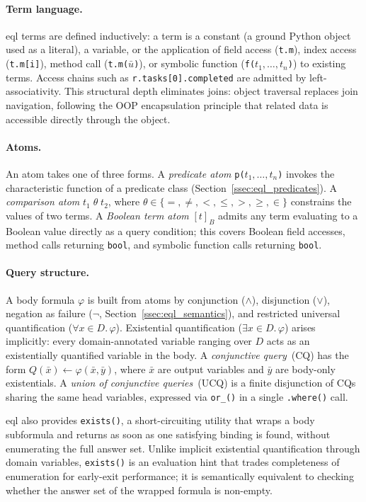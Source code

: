 \documentclass[a4paper,fleqn]{cas-sc}
\begin{document}
\paragraph{Term language.}
\ac{eql} terms are defined inductively: a term is a constant (a ground Python
object used as a literal), a variable, or the application of field access
(\texttt{t.m}), index access (\texttt{t.m[i]}), method call
(\texttt{t.m($\bar{u}$)}), or symbolic function (\texttt{f($t_1,\ldots,t_n$)})
to existing terms. Access chains such as \texttt{r.tasks[0].completed} are
admitted by left-associativity. This structural depth eliminates joins: object traversal replaces join
navigation, following the OOP encapsulation principle that related data is
accessible directly through the object.

\paragraph{Atoms.}
An atom takes one of three forms. A \emph{predicate atom}
\texttt{p($t_1,\ldots,t_n$)} invokes the characteristic function of a
predicate class (Section~\ref{ssec:eql_predicates}). A \emph{comparison
atom} \texttt{$t_1 \;\theta\; t_2$}, where $\theta \in \{=, \neq, <, \leq, >, \geq, \in\}$ constrains the values of two terms. A \emph{Boolean term atom} $[t]_B$ admits any term evaluating to a
Boolean value directly as a query condition; this covers Boolean field
accesses, method calls returning \texttt{bool}, and symbolic function calls
returning \texttt{bool}.

\paragraph{Query structure.}
A body formula $\varphi$ is built from atoms by conjunction ($\wedge$),
disjunction ($\vee$), negation as failure ($\neg$,
Section~\ref{ssec:eql_semantics}), and restricted universal quantification
($\forall x \in D.\,\varphi$). Existential quantification ($\exists x \in
D.\,\varphi$) arises implicitly: every domain-annotated variable ranging over
$D$ acts as an existentially quantified variable in the body. A
\emph{conjunctive query}~(CQ) has the form $Q(\bar{x}) \leftarrow
\varphi(\bar{x}, \bar{y})$, where $\bar{x}$ are output variables and
$\bar{y}$ are body-only existentials. A \emph{union of conjunctive
queries}~(UCQ) is a finite disjunction of CQs sharing the same head
variables, expressed via \texttt{or\_()} in a single \texttt{.where()} call.

\ac{eql} also provides \texttt{exists()}, a short-circuiting utility that
wraps a body subformula and returns as soon as one satisfying binding is
found, without enumerating the full answer set. Unlike implicit existential
quantification through domain variables, \texttt{exists()} is an evaluation
hint that trades completeness of enumeration for early-exit performance; it
is semantically equivalent to checking whether the answer set of the wrapped
formula is non-empty.
\end{document}
